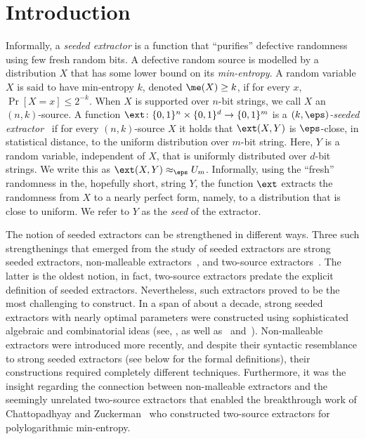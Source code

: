 
%
%
%


\section{Introduction}


Informally, a \emph{seeded extractor} is a function that ``purifies'' defective randomness using few fresh  random bits. A defective random source is modelled by a distribution $X$ that has some
%
 lower bound on its \emph{min-entropy}. A random variable $X$ is said to have min-entropy $k$, denoted $\me(X) \ge k$, if for every $x$, $\Pr[X = x] \le 2^{-k}$.  When $X$ is supported over $n$-bit strings, we call $X$ an $(n,k)$-source. A function $\ext \colon \{0,1\}^n \times \{0,1\}^d \to \{0,1\}^m$ is a \emph{$(k,\eps)$-seeded extractor}~\cite{NZ96} if for every $(n,k)$-source $X$ it holds that $\ext(X,Y)$ is $\eps$-close, in statistical distance, to the uniform distribution over $m$-bit string. Here, $Y$ is a random variable, independent of $X$, that is uniformly distributed over $d$-bit strings. We write this as $\ext(X,Y) \approx_\eps U_m$. Informally, using the ``fresh'' randomness in the,
%
hopefully short, %
string $Y$, the function $\ext$ extracts the randomness from $X$ to a nearly perfect form, namely, to a distribution that is close to uniform. We refer to $Y$ as the \emph{seed} of the extractor.

The notion of seeded extractors can be strengthened in different ways. Three such strengthenings that emerged from the study of seeded extractors are strong seeded extractors, non-malleable extractors~\cite{DW09}, and two-source extractors~\cite{CG88}. The latter is the oldest notion, in fact, two-source extractors predate the explicit definition of seeded extractors. Nevertheless, such extractors proved to be the most challenging to construct. In a span of about a decade, strong seeded extractors with nearly optimal parameters were constructed using sophisticated algebraic and combinatorial ideas (see, \eg, \cite{Trevisan01,LRVW03,GUV09,DKSS13,TSU12} as well as~\cite{Shaltiel11} and~\cite[Chapter 6]{Vadhan12}). Non-malleable extractors were introduced more recently, and despite their syntactic resemblance to strong seeded extractors (see  below for the formal definitions), their constructions required completely different techniques. Furthermore, it was the insight regarding the connection between non-malleable extractors and the seemingly unrelated two-source extractors that enabled the breakthrough
work of Chattopadhyay and Zuckerman~\cite{CZ19} who constructed two-source extractors for
%
polylogarithmic  %
min-entropy. 
%
%
